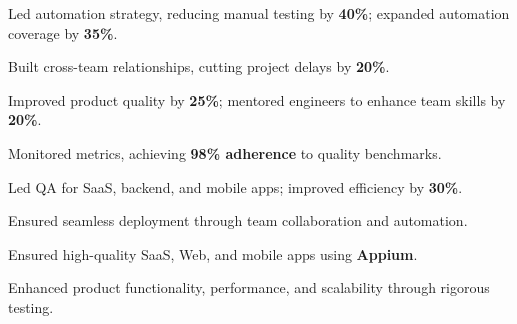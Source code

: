 \documentclass[hmargin=1.5cm, vmargin=1.5cm, scale=0.94]{deedy-resume-openfont}
\begin{document}
\begin{minipage}[t]{0.66\textwidth}
\begin{tightemize}
\item Led automation strategy, reducing manual testing by \textbf{40\%}; expanded automation coverage by \textbf{35\%}.
\item Built cross-team relationships, cutting project delays by \textbf{20\%}.
\end{tightemize}

\begin{tightemize}
\item Improved product quality by \textbf{25\%}; mentored engineers to enhance team skills by \textbf{20\%}.
\item Monitored metrics, achieving \textbf{98\% adherence} to quality benchmarks.
\end{tightemize}

\begin{tightemize}
\item Led QA for SaaS, backend, and mobile apps; improved efficiency by \textbf{30\%}.
\item Ensured seamless deployment through team collaboration and automation.
\end{tightemize}

\begin{tightemize}
\item Ensured high-quality SaaS, Web, and mobile apps using \textbf{Appium}.
\item Enhanced product functionality, performance, and scalability through rigorous testing.
\end{tightemize}

\end{minipage}
\end{document}
